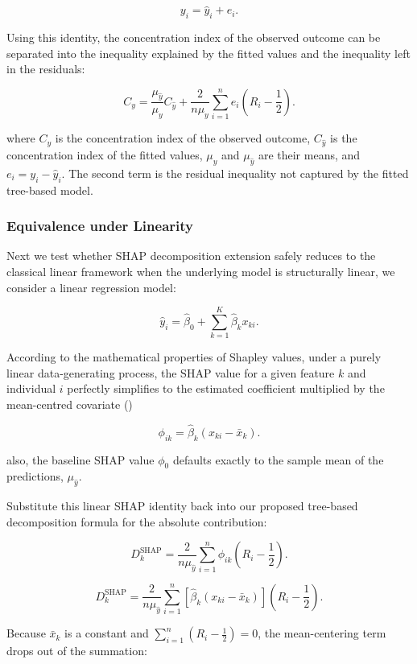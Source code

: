 \documentclass[
  11pt,
  a4paper,
]{article}
\begin{document}
\[
y_i = \hat{y}_i + e_i.
\]

Using this identity, the concentration index of the observed outcome can
be separated into the inequality explained by the fitted values and the
inequality left in the residuals:

\[
C_y
=
\frac{\mu_{\hat{y}}}{\mu_y} C_{\hat{y}}
+
\frac{2}{n\mu_y}
\sum_{i=1}^n
e_i
\left(R_i - \frac{1}{2}\right).
\]

where \(C_y\) is the concentration index of the observed outcome,
\(C_{\hat{y}}\) is the concentration index of the fitted values,
\(\mu_y\) and \(\mu_{\hat{y}}\) are their means, and
\(e_i = y_i - \hat{y}_i\). The second term is the residual inequality
not captured by the fitted tree-based model.

\subsubsection{Equivalence under
Linearity}\label{sec-equivalence-linearity}

Next we test whether SHAP decomposition extension safely reduces to the
classical linear framework when the underlying model is structurally
linear, we consider a linear regression model:

\[
\hat{y}_i = \hat{\beta}_0 + \sum_{k=1}^K \hat{\beta}_k x_{ki}.
\]

According to the mathematical properties of Shapley values, under a
purely linear data-generating process, the SHAP value for a given
feature \(k\) and individual \(i\) perfectly simplifies to the estimated
coefficient multiplied by the mean-centred covariate
()

\[
\phi_{ik} = \hat{\beta}_k (x_{ki} - \bar{x}_k).
\]

also, the baseline SHAP value \(\phi_0\) defaults exactly to the sample
mean of the predictions, \(\mu_{\hat{y}}\).

Substitute this linear SHAP identity back into our proposed tree-based
decomposition formula for the absolute contribution:

\[
D_k^{\text{SHAP}} = \frac{2}{n\mu_{\hat{y}}} \sum_{i=1}^n \phi_{ik} \left(R_i - \frac{1}{2}\right).
\]

\[
D_k^{\text{SHAP}} = \frac{2}{n\mu_{\hat{y}}} \sum_{i=1}^n \left[ \hat{\beta}_k (x_{ki} - \bar{x}_k) \right] \left(R_i - \frac{1}{2}\right).
\]

Because \(\bar{x}_k\) is a constant and
\(\sum_{i=1}^n (R_i - \frac{1}{2}) = 0\), the mean-centering term drops
out of the summation:
\end{document}
